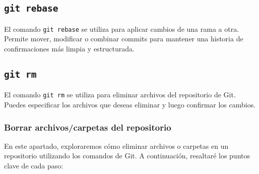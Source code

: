 \documentclass[
  letterpaper,
  DIV=11,
  numbers=noendperiod]{scrartcl}
\begin{document}
\hypertarget{git-rebase}{%
\subsection{\texorpdfstring{\texttt{git\ rebase}}{git rebase}}\label{git-rebase}}

El comando \texttt{git\ rebase} se utiliza para aplicar cambios de una
rama a otra. Permite mover, modificar o combinar commits para mantener
una historia de confirmaciones más limpia y estructurada.

\hypertarget{git-rm}{%
\subsection{\texorpdfstring{\texttt{git\ rm}}{git rm}}\label{git-rm}}

El comando \texttt{git\ rm} se utiliza para eliminar archivos del
repositorio de Git. Puedes especificar los archivos que deseas eliminar
y luego confirmar los cambios.

\hypertarget{borrar-archivoscarpetas-del-repositorio}{%
\subsubsection{Borrar archivos/carpetas del
repositorio}\label{borrar-archivoscarpetas-del-repositorio}}

En este apartado, exploraremos cómo eliminar archivos o carpetas en un
repositorio utilizando los comandos de Git. A continuación, resaltaré
los puntos clave de cada paso:
\end{document}
